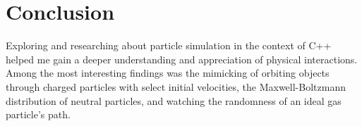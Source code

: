 \documentclass{article}
\begin{document}
\section{Conclusion}
Exploring and researching about particle simulation in the context of C++
helped me gain a deeper understanding and appreciation of physical interactions.
Among the most interesting findings was the mimicking of orbiting
objects through charged particles with select initial velocities,
the Maxwell-Boltzmann distribution of neutral particles,
and watching the randomness of an ideal gas particle's path.
\end{document}
